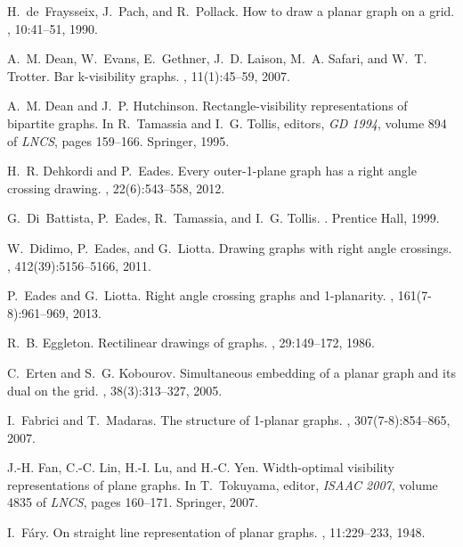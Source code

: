 \documentclass[runningheads]{llncs}
\begin{document}
\begin{thebibliography}{10}
H.~de~Fraysseix, J.~Pach, and R.~Pollack.
\newblock How to draw a planar graph on a grid.
, 10:41--51, 1990.

A.~M. Dean, W.~Evans, E.~Gethner, J.~D. Laison, M.~A. Safari, and W.~T.
  Trotter.
\newblock Bar k-visibility graphs.
, 11(1):45--59, 2007.

A.~M. Dean and J.~P. Hutchinson.
\newblock Rectangle-visibility representations of bipartite graphs.
\newblock In R.~Tamassia and I.~G. Tollis, editors, {\em {GD} 1994}, volume 894
  of {\em LNCS}, pages 159--166. Springer, 1995.

H.~R. Dehkordi and P.~Eades.
\newblock Every outer-1-plane graph has a right angle crossing drawing.
, 22(6):543--558, 2012.

G.~Di~Battista, P.~Eades, R.~Tamassia, and I.~G. Tollis.
.
\newblock Prentice Hall, 1999.

W.~Didimo, P.~Eades, and G.~Liotta.
\newblock Drawing graphs with right angle crossings.
, 412(39):5156--5166, 2011.

P.~Eades and G.~Liotta.
\newblock Right angle crossing graphs and 1-planarity.
, 161(7-8):961--969, 2013.

R.~B. Eggleton.
\newblock Rectilinear drawings of graphs.
, 29:149--172, 1986.

C.~Erten and S.~G. Kobourov.
\newblock Simultaneous embedding of a planar graph and its dual on the grid.
, 38(3):313--327, 2005.

I.~Fabrici and T.~Madaras.
\newblock The structure of 1-planar graphs.
, 307(7-8):854--865, 2007.

J.-H. Fan, C.-C. Lin, H.-I. Lu, and H.-C. Yen.
\newblock Width-optimal visibility representations of plane graphs.
\newblock In T.~Tokuyama, editor, {\em ISAAC 2007}, volume 4835 of {\em LNCS},
  pages 160--171. Springer, 2007.

I.~F\'{a}ry.
\newblock On straight line representation of planar graphs.
, 11:229--233, 1948.


\end{thebibliography}
\end{document}
